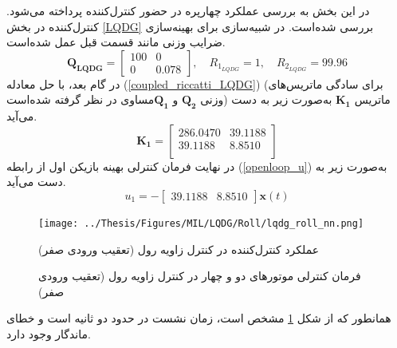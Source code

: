 \documentclass{CCI2020}
\begin{document}
	
	در این بخش به بررسی عملکرد چهارپره در حضور کنترل‌کننده  پرداخته می‌شود. کنترل‌کننده  در بخش
	\ref{LQDG}
	بررسی شده‌است.
	در شبیه‌سازی برای بهینه‌سازی ضرایب وزنی مانند قسمت قبل عمل شده‌است.
	\begin{equation}
		\boldsymbol{Q_{LQDG}} = \begin{bmatrix}
			100 & 0\\
			0 & 0.078
		\end{bmatrix}, \quad R_{1_{LQDG}} =  1, \quad R_{2_{LQDG}} =  99.96
	\end{equation}
	در گام بعد، با حل معادله
	(\ref{coupled_riccatti_LQDG})
	(برای سادگی ماتریس‌های وزنی $\boldsymbol{{Q}_{2}}$ و $\boldsymbol{{Q}_{1}}$مساوی در نظر گرفته شده‌است)
	ماتریس
	$\boldsymbol{{K}_1}$
	به‌صورت زیر به دست می‌آید.
	\begin{equation}
		\boldsymbol{K_1} = \begin{bmatrix}
			
			286.0470  & 39.1188\\
			39.1188   & 8.8510\\
		\end{bmatrix}
	\end{equation}
	در نهایت فرمان کنترلی بهینه بازیکن اول از رابطه
	(\ref{openloop_u})
	به‌صورت زیر به دست می‌آید.
	\begin{equation}
		u_1 = -\begin{bmatrix}
			39.1188   & 8.8510
		\end{bmatrix}\boldsymbol{x}(t)
	\end{equation}
	
	\begin{figure}[H]
		\texttt{[image: ../Thesis/Figures/MIL/LQDG/Roll/lqdg\_roll\_nn.png]}
		\centering
		\caption{عملكرد کنترل‌کننده  در کنترل زاويه رول (تعقیب ورودی صفر)}
		\label{lqdg_roll_fig_simulation}
	\end{figure}
	\begin{figure}[H]
		\centering
		\caption{فرمان کنترلی موتورهای دو و چهار در کنترل زاویه رول (تعقیب ورودی صفر)}
	\end{figure}
	 همانطور که از شکل
	\ref{lqdg_roll_fig_simulation}
	مشخص است، زمان نشست در حدود دو ثانیه است و خطای ماندگار وجود دارد.
	
\end{document}
